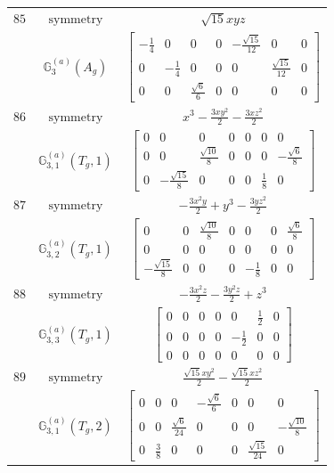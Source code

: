 \documentclass[fleqn,8pt,landscape]{jsarticle}
\begin{document}
\begin{longtable}{ccc}
$ 85 $ & $ \text{symmetry} $ & $ \sqrt{15} x y z $ \\
$  $ & $ \mathbb{G}_{3}^{(a)}(A_{g}) $ & $ \begin{bmatrix} - \frac{1}{4} & 0 & 0 & 0 & - \frac{\sqrt{15}}{12} & 0 & 0 \\ 0 & - \frac{1}{4} & 0 & 0 & 0 & \frac{\sqrt{15}}{12} & 0 \\ 0 & 0 & \frac{\sqrt{6}}{6} & 0 & 0 & 0 & 0 \end{bmatrix} $ \\ \hline
$ 86 $ & $ \text{symmetry} $ & $ x^{3} - \frac{3 x y^{2}}{2} - \frac{3 x z^{2}}{2} $ \\
$  $ & $ \mathbb{G}_{3,1}^{(a)}(T_{g},1) $ & $ \begin{bmatrix} 0 & 0 & 0 & 0 & 0 & 0 & 0 \\ 0 & 0 & \frac{\sqrt{10}}{8} & 0 & 0 & 0 & - \frac{\sqrt{6}}{8} \\ 0 & - \frac{\sqrt{15}}{8} & 0 & 0 & 0 & \frac{1}{8} & 0 \end{bmatrix} $ \\ \hline
$ 87 $ & $ \text{symmetry} $ & $ - \frac{3 x^{2} y}{2} + y^{3} - \frac{3 y z^{2}}{2} $ \\
$  $ & $ \mathbb{G}_{3,2}^{(a)}(T_{g},1) $ & $ \begin{bmatrix} 0 & 0 & \frac{\sqrt{10}}{8} & 0 & 0 & 0 & \frac{\sqrt{6}}{8} \\ 0 & 0 & 0 & 0 & 0 & 0 & 0 \\ - \frac{\sqrt{15}}{8} & 0 & 0 & 0 & - \frac{1}{8} & 0 & 0 \end{bmatrix} $ \\ \hline
$ 88 $ & $ \text{symmetry} $ & $ - \frac{3 x^{2} z}{2} - \frac{3 y^{2} z}{2} + z^{3} $ \\
$  $ & $ \mathbb{G}_{3,3}^{(a)}(T_{g},1) $ & $ \begin{bmatrix} 0 & 0 & 0 & 0 & 0 & \frac{1}{2} & 0 \\ 0 & 0 & 0 & 0 & - \frac{1}{2} & 0 & 0 \\ 0 & 0 & 0 & 0 & 0 & 0 & 0 \end{bmatrix} $ \\ \hline
$ 89 $ & $ \text{symmetry} $ & $ \frac{\sqrt{15} x y^{2}}{2} - \frac{\sqrt{15} x z^{2}}{2} $ \\
$  $ & $ \mathbb{G}_{3,1}^{(a)}(T_{g},2) $ & $ \begin{bmatrix} 0 & 0 & 0 & - \frac{\sqrt{6}}{6} & 0 & 0 & 0 \\ 0 & 0 & \frac{\sqrt{6}}{24} & 0 & 0 & 0 & - \frac{\sqrt{10}}{8} \\ 0 & \frac{3}{8} & 0 & 0 & 0 & \frac{\sqrt{15}}{24} & 0 \end{bmatrix} $ \\ \hline

\end{longtable}
\end{document}
